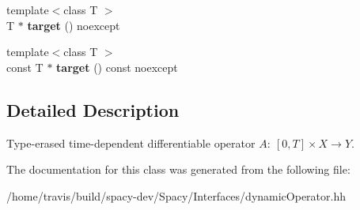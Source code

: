 \begin{DoxyCompactItemize}
\item 
\hypertarget{classSpacy_1_1DynamicC1Operator_a2a1bdf1b5ccc6876ab2698d60318a5a6}{{\footnotesize template$<$class T $>$ }\\T $\ast$ {\bfseries target} () noexcept}\label{classSpacy_1_1DynamicC1Operator_a2a1bdf1b5ccc6876ab2698d60318a5a6}

\item 
\hypertarget{classSpacy_1_1DynamicC1Operator_ae1685f9300539256df1fece193c7fa7b}{{\footnotesize template$<$class T $>$ }\\const T $\ast$ {\bfseries target} () const noexcept}\label{classSpacy_1_1DynamicC1Operator_ae1685f9300539256df1fece193c7fa7b}

\end{DoxyCompactItemize}


\subsection{Detailed Description}
Type-\/erased time-\/dependent differentiable operator $A:\ [0,T] \times X \to Y $. 

The documentation for this class was generated from the following file\-:\begin{DoxyCompactItemize}
\item 
/home/travis/build/spacy-\/dev/\-Spacy/\-Interfaces/dynamic\-Operator.\-hh\end{DoxyCompactItemize}
